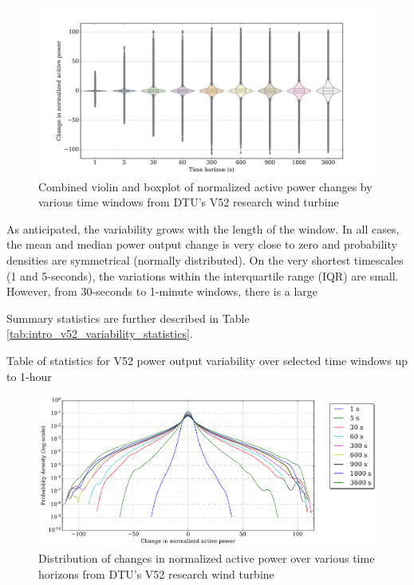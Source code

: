 \begin{figure}[htbp]
    \centering
        \includegraphics[width=1.0\textwidth]{graphics/intro/variability/act_pow_change_vioboxplot.png}
    \caption{Combined violin and boxplot of normalized active power changes by various time windows from DTU's V52 research wind turbine}
    \label{fig:act_pow_change_vioboxplot}
\end{figure}

As anticipated, the variability grows with the length of the window. In all cases, the mean and median power output change is very close to zero and probability densities are symmetrical (normally distributed). On the very shortest timescales (1 and 5-seconds), the variations within the interquartile range (IQR) are small. However, from 30-seconds to 1-minute windows, there is a large 

Summary statistics are further described in Table \ref{tab:intro_v52_variability_statistics}.

\begin{table}
    \centering
    \caption{Table of statistics for V52 power output variability over selected time windows up to 1-hour}
    
    \label{tab:intro_v52_variability_statistics}
\end{table}

\begin{figure}[htbp]
    \centering
        \includegraphics[width=1.0\textwidth]{graphics/intro/variability/norm_act_pow_error_dist.png}
    \caption{Distribution of changes in normalized active power over various time horizons from DTU's V52 research wind turbine}
    \label{fig:norm_act_pow_error_dist}
\end{figure}


